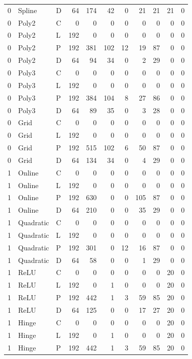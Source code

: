 \begin{longtable}{lllrrrrrrrr}
0 & Spline & D & 64 & 174 & 42 & 0 & 21 & 21 & 21 & 0 \\
0 & Poly2 & C & 0 & 0 & 0 & 0 & 0 & 0 & 0 & 0 \\
0 & Poly2 & L & 192 & 0 & 0 & 0 & 0 & 0 & 0 & 0 \\
0 & Poly2 & P & 192 & 381 & 102 & 12 & 19 & 87 & 0 & 0 \\
0 & Poly2 & D & 64 & 94 & 34 & 0 & 2 & 29 & 0 & 0 \\
0 & Poly3 & C & 0 & 0 & 0 & 0 & 0 & 0 & 0 & 0 \\
0 & Poly3 & L & 192 & 0 & 0 & 0 & 0 & 0 & 0 & 0 \\
0 & Poly3 & P & 192 & 384 & 104 & 8 & 27 & 86 & 0 & 0 \\
0 & Poly3 & D & 64 & 89 & 35 & 0 & 3 & 28 & 0 & 0 \\
0 & Grid & C & 0 & 0 & 0 & 0 & 0 & 0 & 0 & 0 \\
0 & Grid & L & 192 & 0 & 0 & 0 & 0 & 0 & 0 & 0 \\
0 & Grid & P & 192 & 515 & 102 & 6 & 50 & 87 & 0 & 0 \\
0 & Grid & D & 64 & 134 & 34 & 0 & 4 & 29 & 0 & 0 \\
1 & Online & C & 0 & 0 & 0 & 0 & 0 & 0 & 0 & 0 \\
1 & Online & L & 192 & 0 & 0 & 0 & 0 & 0 & 0 & 0 \\
1 & Online & P & 192 & 630 & 0 & 0 & 105 & 87 & 0 & 0 \\
1 & Online & D & 64 & 210 & 0 & 0 & 35 & 29 & 0 & 0 \\
1 & Quadratic & C & 0 & 0 & 0 & 0 & 0 & 0 & 0 & 0 \\
1 & Quadratic & L & 192 & 0 & 0 & 0 & 0 & 0 & 0 & 0 \\
1 & Quadratic & P & 192 & 301 & 0 & 12 & 16 & 87 & 0 & 0 \\
1 & Quadratic & D & 64 & 58 & 0 & 0 & 1 & 29 & 0 & 0 \\
1 & ReLU & C & 0 & 0 & 0 & 0 & 0 & 0 & 20 & 0 \\
1 & ReLU & L & 192 & 0 & 1 & 0 & 0 & 0 & 20 & 0 \\
1 & ReLU & P & 192 & 442 & 1 & 3 & 59 & 85 & 20 & 0 \\
1 & ReLU & D & 64 & 125 & 0 & 0 & 17 & 27 & 20 & 0 \\
1 & Hinge & C & 0 & 0 & 0 & 0 & 0 & 0 & 20 & 0 \\
1 & Hinge & L & 192 & 0 & 1 & 0 & 0 & 0 & 20 & 0 \\
1 & Hinge & P & 192 & 442 & 1 & 3 & 59 & 85 & 20 & 0 \\

\end{longtable}
